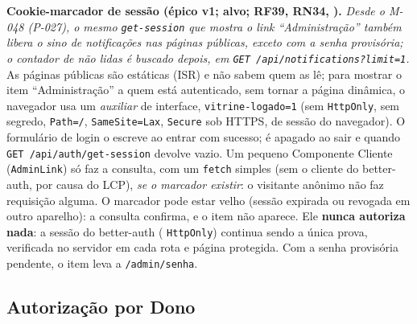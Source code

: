 
\textbf{Cookie-marcador de sessão (épico v1; alvo; RF39, RN34, ).} \emph{Desde o M-048 (P-027), o mesmo \texttt{get-session} que mostra o link ``Administração'' também libera o sino de notificações nas páginas públicas, exceto com a senha provisória; o contador de não lidas é buscado depois, em \texttt{GET /api/notifications?limit=1}.} As páginas públicas são estáticas (ISR) e não sabem quem as lê; para mostrar o item ``Administração'' a quem está autenticado, sem tornar a página dinâmica, o navegador usa um  \emph{auxiliar} de interface, \texttt{vitrine-logado=1} (sem \texttt{HttpOnly}, sem segredo, \texttt{Path=/}, \texttt{SameSite=Lax}, \texttt{Secure} sob HTTPS, de sessão do navegador). O formulário de login o escreve ao entrar com sucesso; é apagado ao sair e quando \texttt{GET /api/auth/get-session} devolve vazio. Um pequeno Componente Cliente (\texttt{AdminLink}) só faz a consulta, com um \texttt{fetch} simples (sem o cliente do better-auth, por causa do LCP), \emph{se o marcador existir}: o visitante anônimo não faz requisição alguma. O marcador pode estar velho (sessão expirada ou revogada em outro aparelho): a consulta confirma, e o item não aparece. Ele \textbf{nunca autoriza nada}: a sessão do better-auth ( \texttt{HttpOnly}) continua sendo a única prova, verificada no servidor em cada rota e página protegida. Com a senha provisória pendente, o item leva a \texttt{/admin/senha}.

\subsection{Autorização por Dono}\label{sec:arq-autorizacao}

